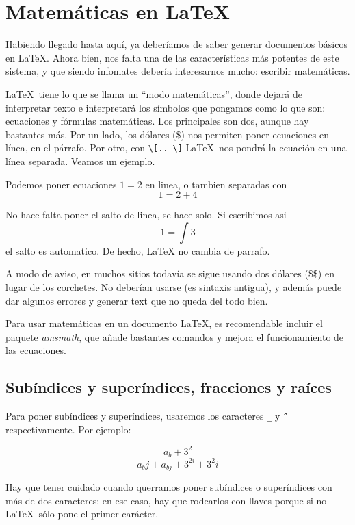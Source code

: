 \section{Matemáticas en \LaTeX}

Habiendo llegado hasta aquí, ya deberíamos de saber generar documentos básicos en \LaTeX. Ahora bien, nos falta una de las características más potentes de este sistema, y que siendo infomates debería interesarnos mucho: escribir matemáticas.

\LaTeX\ tiene lo que se llama un ``modo matemáticas'', donde dejará de interpretar texto e interpretará los símbolos que pongamos como lo que son: ecuaciones y fórmulas matemáticas. Los principales son dos, aunque hay bastantes más. Por un lado, los dólares (\$) nos permiten poner ecuaciones en línea, en el párrafo. Por otro, con \verb|\[.. \]| \LaTeX\ nos pondrá la ecuación en una línea separada. Veamos un ejemplo.

\begin{LTXexample}[pos=r]
Podemos poner ecuaciones $1 = 2$
en linea, o tambien separadas con
\[ 1 = 2 + 4 \]

No hace falta poner el salto de
linea, se hace solo. Si escribimos
asi \[ 1 = \int 3 \] el salto es
automatico. De hecho, LaTeX no
cambia de parrafo.
\end{LTXexample}

A modo de aviso, en muchos sitios todavía se sigue usando dos dólares (\$\$) en lugar de los corchetes. No deberían usarse (es sintaxis antigua), y además puede dar algunos errores y generar text que no queda del todo bien.

Para usar matemáticas en un documento \LaTeX, es recomendable incluir el paquete \textit{amsmath}, que añade bastantes comandos y mejora el funcionamiento de las ecuaciones.

\subsection{Subíndices y superíndices, fracciones y raíces}

Para poner subíndices y superíndices, usaremos los caracteres \verb|_| y \verb|^| respectivamente. Por ejemplo:

\begin{LTXexample}[pos=r]
\[ a_b + 3^2 \]
\[ a_bj + a_{bj} + 3^{2i} + 3^2i\]
\end{LTXexample}

Hay que tener cuidado cuando querramos poner subíndices o superíndices con más de dos caracteres: en ese caso, hay que rodearlos con llaves porque si no \LaTeX\ sólo pone el primer carácter.

